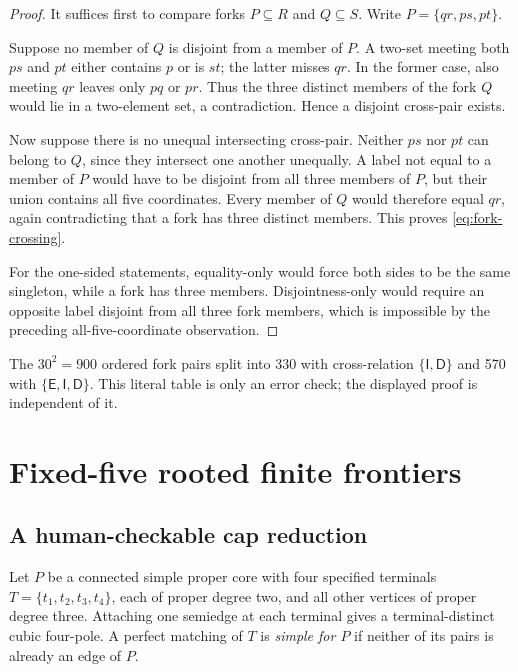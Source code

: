 \documentclass[11pt]{article}
\theoremstyle{definition}
\theoremstyle{remark}
\begin{document}
\begin{proof}
It suffices first to compare forks \(P\subseteq R\) and \(Q\subseteq S\).
Write \(P=\{qr,ps,pt\}\).

Suppose no member of \(Q\) is disjoint from a member of \(P\).
A two-set meeting both \(ps\) and \(pt\) either contains \(p\) or is
\(st\); the latter misses \(qr\).  In the former case, also meeting
\(qr\) leaves only \(pq\) or \(pr\).  Thus the three distinct members
of the fork \(Q\) would lie in a two-element set, a contradiction.
Hence a disjoint cross-pair exists.

Now suppose there is no unequal intersecting cross-pair.  Neither
\(ps\) nor \(pt\) can belong to \(Q\), since they intersect one another
unequally.  A label not equal to a member of \(P\) would have to be
disjoint from all three members of \(P\), but their union contains all
five coordinates.  Every member of \(Q\) would therefore equal \(qr\),
again contradicting that a fork has three distinct members.  This
proves \eqref{eq:fork-crossing}.

For the one-sided statements, equality-only would force both sides to
be the same singleton, while a fork has three members.  Disjointness-only
would require an opposite label disjoint from all three fork members,
which is impossible by the preceding all-five-coordinate observation.
\end{proof}

The \(30^2=900\) ordered fork pairs split into 330 with cross-relation
\(\{\mathsf I,\mathsf D\}\) and 570 with
\(\{\mathsf E,\mathsf I,\mathsf D\}\).  This literal table is only an
error check; the displayed proof is independent of it.

\section{Fixed-five rooted finite frontiers}

\subsection{A human-checkable cap reduction}

Let \(P\) be a connected simple proper core with four specified
terminals \(T=\{t_1,t_2,t_3,t_4\}\), each of proper degree two, and all
other vertices of proper degree three.  Attaching one semiedge at each
terminal gives a terminal-distinct cubic four-pole.  A perfect matching
of \(T\) is \emph{simple for \(P\)} if neither of its pairs is already
an edge of \(P\).
\end{document}
